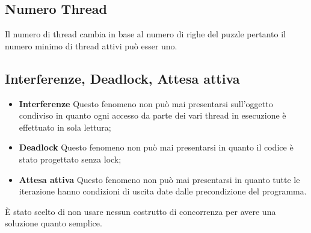 \documentclass[13pt]{article}
\begin{document}
\subsection{Numero Thread}
Il numero di thread cambia in base al numero di righe del puzzle pertanto il numero minimo di thread attivi può esser uno. 
\subsection{Interferenze, Deadlock, Attesa attiva}
\begin{itemize}
	\item \textbf{Interferenze}
	Questo fenomeno non può mai presentarsi sull'oggetto condiviso in quanto ogni accesso da parte dei vari thread in esecuzione è effettuato in sola lettura;
	\item \textbf{Deadlock}
	Questo fenomeno non può mai presentarsi in quanto il codice è stato progettato senza lock;
	\item \textbf{Attesa attiva}
	Questo fenomeno non può mai presentarsi in quanto tutte le iterazione hanno condizioni di uscita date dalle precondizione del programma.
\end{itemize}
È stato scelto di non usare nessun costrutto di concorrenza per avere una soluzione quanto semplice.
 
\end{document}
